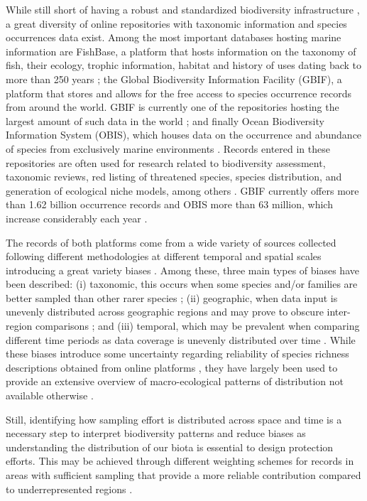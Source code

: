 \documentclass[12pt,authoryear]{elsarticle}
\begin{document}
While still short of having a robust and standardized biodiversity infrastructure \citep{heberling_data_2021}, a great diversity of online repositories with taxonomic information and species occurrences data exist. Among the most important databases hosting marine information are FishBase, a platform that hosts information on the taxonomy of fish, their ecology, trophic information, habitat and history of uses dating back to more than 250 years \citep{froese2000fishbase}; the Global Biodiversity Information Facility (GBIF), a platform that stores and allows for the free access to species occurrence records from around the world. GBIF is currently one of the repositories hosting the largest amount of such data in the world \citep{telenius2011, gbif}; and finally Ocean Biodiversity Information System (OBIS), which houses data on the occurrence and abundance of species from exclusively marine environments \citep{obis}. Records entered in these repositories are often used for research related to biodiversity assessment, taxonomic reviews, red listing of threatened species, species distribution, and generation of ecological niche models, among others \citep{yesson2007}. GBIF currently offers more than 1.62 billion occurrence records and OBIS more than 63 million, which increase considerably each year \citep{gbif, obis}.

The records of both platforms come from a wide variety of sources collected following different methodologies at different temporal and spatial scales introducing a great variety  biases \citep{beck2014, zizka2020}. Among these, three main types of biases have been described: (i) taxonomic, this occurs when some species and/or families are better sampled than other rarer species \citep{chandler2017}; (ii) geographic, when data input is unevenly distributed across geographic regions and may prove to obscure inter-region comparisons \citep{yang2013geographical, yesson2007}; and (iii) temporal, which may be prevalent when comparing different time periods as data coverage is unevenly distributed over time \citep{chandler2017, yang2013geographical}. While these biases introduce some uncertainty regarding reliability of species richness descriptions obtained from online platforms \citep{beck2014, garcia2015}, they have largely been used to provide an extensive overview of macro-ecological patterns of distribution not available otherwise \citep{mora2008completeness,troia2017}. 

Still, identifying how sampling effort is distributed across space and time is a necessary step to interpret biodiversity patterns and reduce biases as understanding the distribution of our biota is essential to design protection efforts. This may be achieved through different weighting schemes for records in areas with sufficient sampling that provide a more reliable contribution compared to underrepresented regions \citep{phillips2009, hortal2008, yang2013geographical}. 
\end{document}
